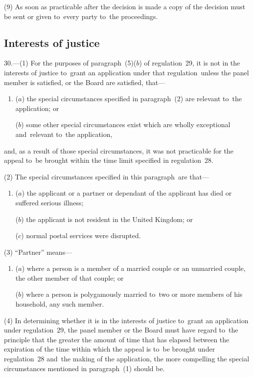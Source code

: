 \documentclass[12pt,a4paper]{article}
\begin{document}
(9) As soon as practicable after the decision is made a copy of the decision must be sent or given to~every party to~the proceedings.

\subsection[30. Interests of justice]{Interests of justice}

30.---(1)  For the purposes of paragraph~(5)($b$)  of regulation~29, it is not in the interests of justice to~grant an application under that regulation~unless the panel member is satisfied, or the Board are satisfied, that—
\begin{enumerate}\item[]
($a$) the special circumstances specified in paragraph~(2) are relevant to~the application; or

($b$) some other special circumstances exist which are wholly exceptional and~relevant to~the application,
\end{enumerate}
and, as a result of those special circumstances, it was not practicable for the appeal to~be brought within the time limit specified in regulation~28.

(2) The special circumstances specified in this paragraph~are that—
\begin{enumerate}\item[]
($a$) the applicant or a partner or dependant of the applicant has died or suffered serious illness;

($b$) the applicant is not resident in the United Kingdom; or

($c$) normal postal services were disrupted.
\end{enumerate}

(3) “Partner” means—
\begin{enumerate}\item[]
($a$) where a person is a member of a married couple or an unmarried couple, the other member of that couple; or

($b$) where a person is polygamously married to~two or more members of his household, any such member.
\end{enumerate}

(4) In determining whether it is in the interests of justice to~grant an application under regulation~29, the panel member or the Board must have regard to~the principle that the greater the amount of time that has elapsed between the expiration of the time within which the appeal is to~be brought under regulation~28 and~the making of the application, the more compelling the special circumstances mentioned in paragraph~(1) should be.
\end{document}
